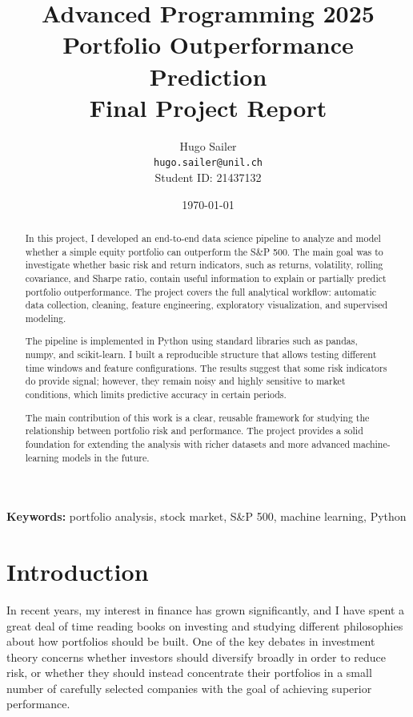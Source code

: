 \documentclass[11pt,a4paper]{article}
\title{%
    \Large \textbf{Advanced Programming 2025} \\
    \vspace{0.5cm}
    \LARGE \textbf{Portfolio Outperformance Prediction} \\
    \vspace{0.3cm}
    \large Final Project Report
}
\author{
    Hugo Sailer \\
    \texttt{hugo.sailer@unil.ch} \\
    Student ID: 21437132
}
\date{\today}
\begin{document}
\maketitle
\thispagestyle{empty}

\begin{abstract}
In this project, I developed an end-to-end data science pipeline to analyze and model whether a simple equity portfolio can outperform the S&P 500. The main goal was to investigate whether basic risk and return indicators, such as returns, volatility, rolling covariance, and Sharpe ratio, contain useful information to explain or partially predict portfolio outperformance. The project covers the full analytical workflow: automatic data collection, cleaning, feature engineering, exploratory visualization, and supervised modeling.

The pipeline is implemented in Python using standard libraries such as pandas, numpy, and scikit-learn. I built a reproducible structure that allows testing different time windows and feature configurations. The results suggest that some risk indicators do provide signal; however, they remain noisy and highly sensitive to market conditions, which limits predictive accuracy in certain periods.

The main contribution of this work is a clear, reusable framework for studying the relationship between portfolio risk and performance. The project provides a solid foundation for extending the analysis with richer datasets and more advanced machine-learning models in the future.

\end{abstract}

\vspace{0.5cm}
\noindent\textbf{Keywords:} portfolio analysis, stock market, S&P 500, machine learning, Python
\newpage
\tableofcontents
\newpage


\section{Introduction}
\label{sec:introduction}

In recent years, my interest in finance has grown significantly, and I have spent a great deal of time reading books on investing and studying different philosophies about how portfolios should be built. One of the key debates in investment theory concerns whether investors should diversify broadly in order to reduce risk, or whether they should instead concentrate their portfolios in a small number of carefully selected companies with the goal of achieving superior performance.
\end{document}
